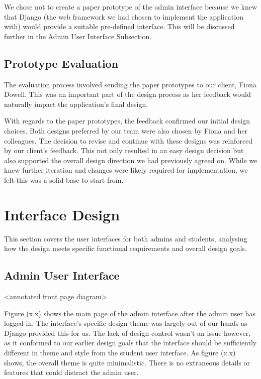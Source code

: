 \documentclass{l3proj}
\begin{document}
We chose not to create a paper prototype of the admin interface because we knew that Django (the web framework we had chosen to implement the application with) would provide a suitable pre-defined interface. This will be discussed further in the Admin User Interface Subsection. 
 
\subsection{Prototype Evaluation}

The evaluation process involved sending the paper prototypes to our client, Fiona Dowell. This was an important part of the design process as her feedback would naturally impact the application's final design. 

With regards to the paper prototypes, the feedback confirmed our initial design choices. Both designs preferred by our team were also chosen by Fiona and her colleagues. The decision to revise and continue with these designs was reinforced by our client's feedback. This not only resulted in an easy design decision but also supported the overall design direction we had previously agreed on. While we knew further iteration and changes were likely required for implementation, we felt this was a solid base to start from.

\section{Interface Design}

This section covers the user interfaces for both admins and students, analysing how the design meets specific functional requirements and overall design goals.

\subsection{Admin User Interface}

<annotated front page diagram>

Figure (x.x) shows the main page of the admin interface after the admin user has logged in. The interface's specific design theme was largely out of our hands as Django provided this for us. The lack of design control wasn't an issue however, as it conformed to our earlier design goals that the interface should be sufficiently different in theme and style from the student user interface. As figure (x.x) shows, the overall theme is quite minimalistic. There is no extraneous details or features that could distract the admin user.
\end{document}
